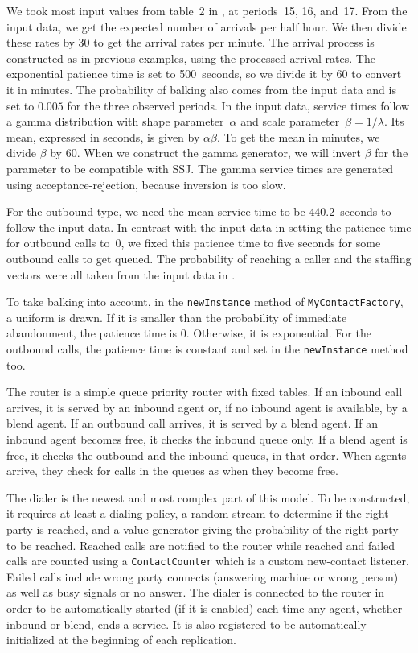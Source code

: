 We took most input values from table~2 in \cite{ccDES07a}, at
periods~15, 16, and~17.
From the input data, we get the expected number of arrivals per half hour.
We then divide these rates by 30 to get the arrival rates per minute.
The arrival process is constructed as in previous examples, using the
processed arrival rates.
The exponential patience time is set to
500~seconds, so we divide it by 60 to convert it in minutes.
The probability of balking also comes from the input data and is set
to $0.005$ for the three observed periods.
In the input data,
service times follow a gamma distribution with shape
parameter~$\alpha$ and scale parameter~$\beta=1/\lambda$.  Its mean,
expressed in seconds, is given by $\alpha\beta$.  To get the mean in
minutes, we divide $\beta$ by 60.  When we construct the gamma
generator, we will invert $\beta$ for the parameter to be compatible
with SSJ.
The gamma service times are generated using acceptance-rejection,
because inversion is too slow.

For the outbound type, we need the mean service time to be
$440.2$~seconds to follow the input data.  In contrast with the input
data in \cite{ccDES07a} setting the patience time for outbound calls
to~0, we fixed this patience time
to five
seconds for some outbound calls to get queued.  The probability of
reaching a caller and the staffing vectors were all taken from the
input data in \cite{ccDES07a}.

To take balking into account,
in the \texttt{new\-Instance} method of
\texttt{My\-Contact\-Factory}, a uniform is drawn.  If it
is smaller than the probability of immediate abandonment, the
patience time is 0.  Otherwise, it is exponential.  For the outbound
calls, the patience time is constant and set in the
\texttt{new\-Instance} method too.

The router is a simple queue priority router with fixed tables.
If an
inbound call arrives, it is served by an inbound agent or, if no
inbound agent is available, by a blend agent.  If an outbound call
arrives, it is served by a blend agent.  If an inbound agent becomes
free, it checks the inbound queue only.  If a blend agent is free, it
checks the outbound and the inbound queues, in that order.  When agents
arrive, they check for calls in the queues as when they become free.

The dialer is the newest and most complex part of this model.  To be
constructed, it requires at least a dialing policy, a random stream to
determine if the right party is reached, and a value generator giving
the probability of the right party to be reached.
Reached calls are notified to the router while
reached and failed calls are counted
using a \texttt{Contact\-Counter} which is a custom new-contact
listener.  Failed calls
include wrong party connects (answering machine or wrong person) as
well as busy signals or no answer.  The dialer
is connected to the router in order to be automatically started
(if it is enabled) each time any agent, whether inbound or blend, ends
a service.
It is also registered to be automatically initialized at the beginning
of each replication.


